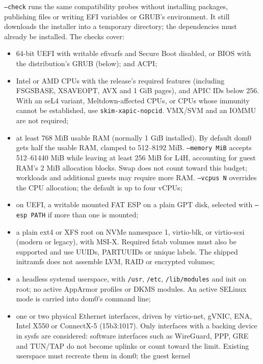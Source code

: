 \documentclass[11pt,a4paper]{report}
\newcommand{\file}[1]{\texttt{#1}}
\begin{document}
\texttt{--check} runs the same compatibility probes without installing
packages, publishing files or writing EFI variables or GRUB's
environment. It still downloads
the installer into a temporary directory; the dependencies must already
be installed. The checks cover:
\begin{itemize}
  \item 64-bit UEFI with writable efivarfs and Secure Boot disabled, or
        BIOS with the distribution's GRUB (below); and ACPI;
  \item Intel or AMD CPUs with the release's required features
        (including FSGSBASE, XSAVEOPT, AVX and 1 GiB pages), and APIC IDs
        below 256. With an seL4 variant, Meltdown-affected CPUs, or CPUs
        whose immunity cannot be established, use
        \texttt{skim-xapic-nopcid}. VMX/SVM and an IOMMU are not required;
  \item at least 768 MiB usable RAM (normally 1 GiB installed). By default
        dom0 gets half the usable RAM, clamped to 512--8192 MiB.
        \texttt{--memory MiB} accepts 512--61440 MiB while leaving at least
        256 MiB for L4H, accounting for guest RAM's 2 MiB allocation blocks.
        Swap does not count toward this budget; workloads and additional
        guests may require more RAM. \texttt{--vcpus N} overrides the CPU
        allocation; the default is up to four vCPUs;
  \item on UEFI, a writable mounted FAT ESP on a plain GPT disk, selected
        with \texttt{--esp PATH} if more than one is mounted;
  \item a plain ext4 or XFS root on NVMe namespace 1, virtio-blk, or
        virtio-scsi (modern or legacy), with MSI-X. Required fstab volumes must also be
        supported and use UUIDs, PARTUUIDs or unique labels. The shipped
        initramfs does not assemble LVM, RAID or encrypted volumes;
  \item a headless systemd userspace, with \file{/usr}, \file{/etc},
        \file{/lib/modules} and init on root; no active AppArmor profiles
        or DKMS modules. An active SELinux mode is carried into dom0's
        command line;
  \item one or two physical Ethernet interfaces, driven by virtio-net,
        gVNIC, ENA, Intel X550 or ConnectX-5 (15b3:1017). Only interfaces with a backing device in
        sysfs are considered: software interfaces such as WireGuard, PPP,
        GRE and TUN/TAP do not become uplinks or count toward the limit.
        Existing userspace must recreate them in dom0; the guest kernel

\end{itemize}
\end{document}
